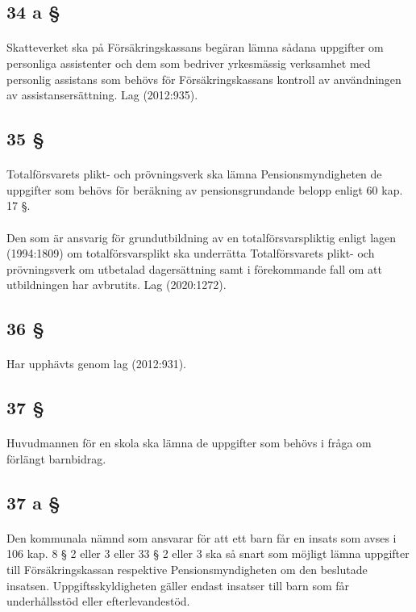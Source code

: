 \documentclass[a4paper,notitlepage,openany,10pt]{book}
\begin{document}
\subsection*{34 a §}
\paragraph*{}
Skatteverket ska på Försäkringskassans begäran lämna sådana uppgifter om personliga assistenter och dem som bedriver yrkesmässig verksamhet med personlig assistans som behövs för Försäkringskassans kontroll av användningen av assistansersättning.
Lag (2012:935).
\subsection*{35 §}
\paragraph*{}
Totalförsvarets plikt- och prövningsverk ska lämna Pensionsmyndigheten de uppgifter som behövs för beräkning av pensionsgrundande belopp enligt 60 kap. 17 §.
\paragraph*{}
Den som är ansvarig för grundutbildning av en totalförsvarspliktig enligt lagen (1994:1809) om totalförsvarsplikt ska underrätta Totalförsvarets plikt- och prövningsverk om utbetalad dagersättning samt i förekommande fall om att utbildningen har avbrutits.
Lag (2020:1272).
\subsection*{36 §}
\paragraph*{}
Har upphävts genom
lag (2012:931).
\subsection*{37 §}
\paragraph*{}
Huvudmannen för en skola ska lämna de uppgifter som behövs i fråga om förlängt barnbidrag.
\subsection*{37 a §}
\paragraph*{}
Den kommunala nämnd som ansvarar för att ett barn får en insats som avses i 106 kap. 8 § 2 eller 3 eller 33 § 2 eller 3 ska så snart som möjligt lämna uppgifter till Försäkringskassan respektive Pensionsmyndigheten om den beslutade insatsen. Uppgiftsskyldigheten gäller endast insatser till barn som får underhållsstöd eller efterlevandestöd.
\end{document}
